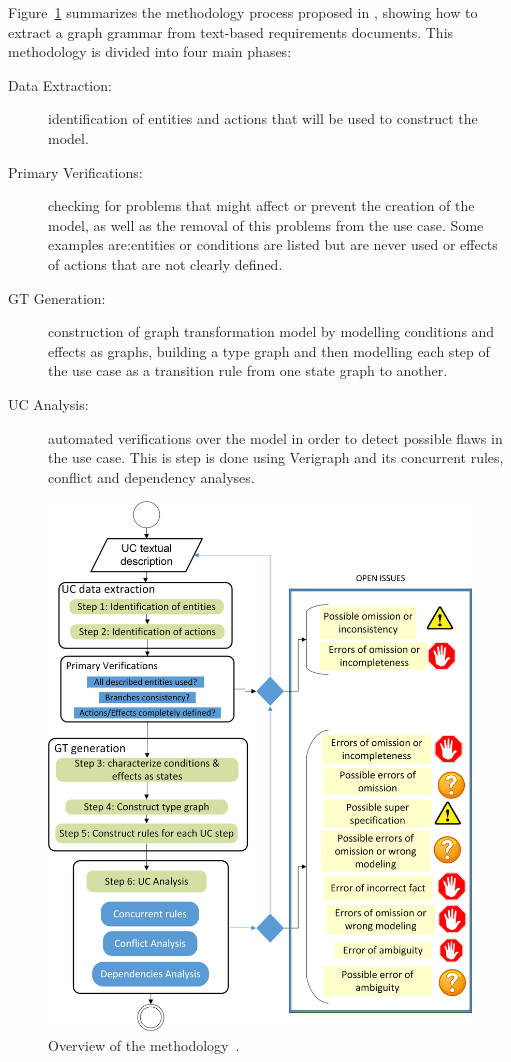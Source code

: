 Figure~\ref{fig:tests:methodology} summarizes the methodology process proposed in \cite{Junior2015}, showing how to extract a graph grammar from text-based requirements documents. This methodology is divided into four main phases:


\begin{description}
  \item[Data Extraction:] identification of entities and actions that will be used to construct the model.

  \item[Primary Verifications:] checking for problems that might affect or prevent the creation of the model, as well as the removal of this problems from the use case. Some examples are:entities or conditions are listed but are never used or effects of actions that are not clearly defined.

  \item[GT Generation:] construction of graph transformation model by modelling conditions and effects as graphs, building a type graph and then modelling each step of the use case as a transition rule from one state graph to another.

  \item[UC Analysis:] automated verifications over the model in order to detect possible flaws in the use case. This is step is done using Verigraph and its concurrent rules, conflict and dependency analyses.
\end{description}

\begin{figure}[!ht]
  \centering
  \includegraphics[scale=0.7]{images/generating-tests/methodology}
  \caption{Overview of the methodology~\cite{Junior2015}.}\label{fig:tests:methodology}
\end{figure}

